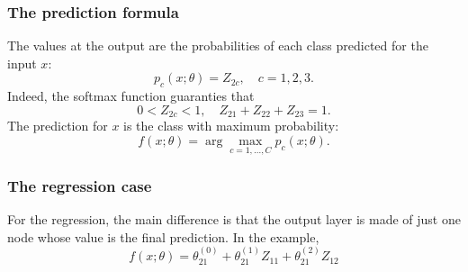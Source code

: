 \begin{frame}
\frametitle{The prediction formula}
The values at the output are the probabilities of each class predicted for the input $x$:
$$
p_c(x;\theta) = Z_{2c}, \quad c=1,2,3.
$$
Indeed, the softmax function guaranties that
$$
0 < Z_{2c} < 1, \quad Z_{21}+Z_{22}+Z_{23} = 1.
$$
The prediction for $x$ is the class with maximum probability:
$$
f(x;\theta) = \arg \max_{c=1,\ldots,C} p_c(x;\theta).
$$
\end{frame}
\begin{frame}
\frametitle{The regression case}
For the regression, the main difference is that the output layer is made of just one node whose value is the final prediction. In the example,
$$
f(x;\theta) = \theta_{21}^{(0)} + \theta_{21}^{(1)} Z_{11} + \theta_{21}^{(2)} Z_{12}
$$
\end{frame}
